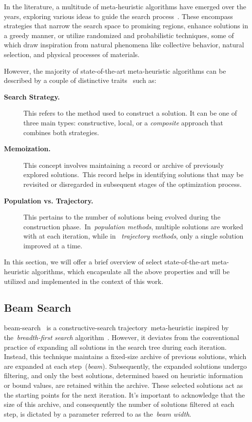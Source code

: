 In the literature, a multitude of meta-heuristic algorithms have emerged over
the years, exploring various ideas to guide the search
process~\cite{osman1996metaheuristics}. These encompass strategies that narrow
the search space to promising regions, enhance solutions in a greedy manner, or
utilize randomized and probabilistic techniques, some of which draw inspiration
from natural phenomena like collective behavior, natural selection, and physical
processes of materials.

However, the majority of state-of-the-art meta-heuristic algorithms can be
described by a couple of distinctive traits~\cite{blum2003metaheuristics} such as:

\begin{description}
  \item[\textbf{Search Strategy.}] This refers to the method used to construct a
    solution. It can be one of three main types: constructive, local, or a
    \emph{composite} approach that combines both strategies.

  \item[\textbf{Memoization.}] This concept involves maintaining a record or
    archive of previously explored solutions.~This record helps in identifying
    solutions that may be revisited or disregarded in subsequent stages of the
    optimization process.

  \item[\textbf{Population vs. Trajectory.}] This pertains to the number of
    solutions being evolved during the construction phase.~In~\emph{population
      methods}, multiple solutions are worked with at each iteration, while in
    ~\emph{trajectory methods}, only a single solution improved at a time.
\end{description}

In this section, we will offer a brief overview of select state-of-the-art
\acrshort{meta-heuristic} algorithms, which encapsulate all the above properties
and will be utilized and implemented in the context of this work.

\subsection{Beam Search}
\label{subsec:beam-search}

\acrfull{beam-search}~\cite{ow1988filtered,outeiro2021application} is a
\acrshort{constructive-search} trajectory~\acrfull{meta-heuristic} inspired by
the~\emph{breadth-first search} algorithm~\cite{papadimitriou1998combinatorial}.
However, it deviates from the conventional practice of expanding all solutions
in the search tree during each iteration. Instead, this technique maintains a
fixed-size archive of previous solutions, which are expanded at each
step~(\textit{beam}). Subsequently, the expanded solutions undergo filtering,
and only the best solutions, determined based on heuristic information or bound
values, are retained within the archive. These selected solutions act as the
starting points for the next iteration. It's important to acknowledge that the
size of this archive, and consequently the number of solutions filtered at each
step, is dictated by a parameter referred to as the~\emph{beam width}.

